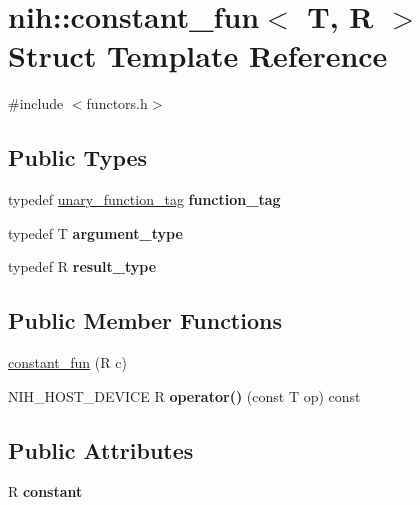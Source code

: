 \hypertarget{structnih_1_1constant__fun}{
\section{nih\-:\-:constant\-\_\-fun$<$ \-T, \-R $>$ \-Struct \-Template \-Reference}
\label{structnih_1_1constant__fun}
}


{\ttfamily \#include $<$functors.\-h$>$}

\subsection*{\-Public \-Types}
\begin{DoxyCompactItemize}
\item 
\hypertarget{structnih_1_1constant__fun_a092e8995ae33476a876010a50c45254e}{
typedef \hyperlink{structnih_1_1unary__function__tag}{unary\-\_\-function\-\_\-tag} {\bfseries function\-\_\-tag}}
\label{structnih_1_1constant__fun_a092e8995ae33476a876010a50c45254e}

\item 
\hypertarget{structnih_1_1constant__fun_a5456b977cb6d560f494acebd6a124ae4}{
typedef \-T {\bfseries argument\-\_\-type}}
\label{structnih_1_1constant__fun_a5456b977cb6d560f494acebd6a124ae4}

\item 
\hypertarget{structnih_1_1constant__fun_aef3df40234b8dcecae1e77197a02d0f8}{
typedef \-R {\bfseries result\-\_\-type}}
\label{structnih_1_1constant__fun_aef3df40234b8dcecae1e77197a02d0f8}

\end{DoxyCompactItemize}
\subsection*{\-Public \-Member \-Functions}
\begin{DoxyCompactItemize}
\item 
\hyperlink{structnih_1_1constant__fun_ae49681ec415885c13e276ee526c1b9c0}{constant\-\_\-fun} (\-R c)
\item 
\hypertarget{structnih_1_1constant__fun_a9629dd70dbca0e4bdbd1c4248987f4ff}{
\-N\-I\-H\-\_\-\-H\-O\-S\-T\-\_\-\-D\-E\-V\-I\-C\-E \-R {\bfseries operator()} (const \-T op) const }
\label{structnih_1_1constant__fun_a9629dd70dbca0e4bdbd1c4248987f4ff}

\end{DoxyCompactItemize}
\subsection*{\-Public \-Attributes}
\begin{DoxyCompactItemize}
\item 
\hypertarget{structnih_1_1constant__fun_a80901192d932e9cc5a6086d011ec30e1}{
\-R {\bfseries constant}}
\label{structnih_1_1constant__fun_a80901192d932e9cc5a6086d011ec30e1}

\end{DoxyCompactItemize}


